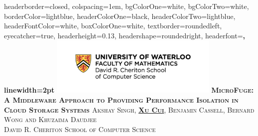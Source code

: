 \documentclass[landscape,archE,fontscale=0.29]{baposter} %
\begin{document}
\begin{poster}
{
headerborder=closed, %
colspacing=1em, %
bgColorOne=white, %
bgColorTwo=white, %
borderColor=lightblue, %
headerColorOne=black, %
headerColorTwo=lightblue, %
headerFontColor=white, %
boxColorOne=white, %
textborder=roundedleft, %
eyecatcher=true, %
headerheight=0.13\textheight, %
headershape=roundedright, %
headerfont=\Large\bf\textsc, %
linewidth=2pt %
}
%
{\includegraphics[height=7.5em]{img/Cheriton_Logo.pdf}} %
{\bf\textsc{MicroFuge: A Middleware Approach to Providing
    Performance Isolation in Cloud Storage Systems \cite{microfuge14}}\vspace{0.1em}} %
{\vspace{-2mm}
\textsc{Akshay Singh, \textbf{\underline{Xu Cui}}, Benjamin Cassell, Bernard Wong and
    Khuzaima Daudjee \\ David R. Cheriton School of Computer Science}} %


\end{poster}
\end{document}
